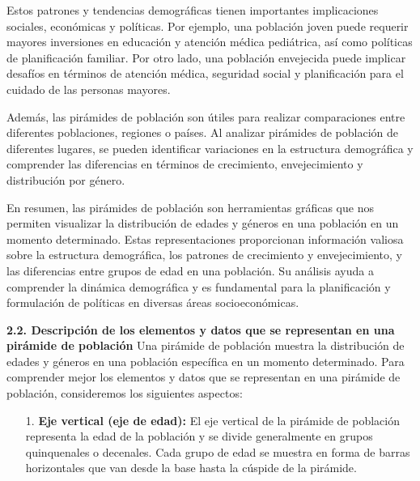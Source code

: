 \documentclass[8pt,a4paper]{beamer}
\begin{document}
{\begin{frame}{}
\begin{block}{}
Estos patrones y tendencias demográficas tienen importantes implicaciones sociales, económicas y políticas. Por ejemplo, una población joven puede requerir mayores inversiones en educación y atención médica pediátrica, así como políticas de planificación familiar. Por otro lado, una población envejecida puede implicar desafíos en términos de atención médica, seguridad social y planificación para el cuidado de las personas mayores.

Además, las pirámides de población son útiles para realizar comparaciones entre diferentes poblaciones, regiones o países. Al analizar pirámides de población de diferentes lugares, se pueden identificar variaciones en la estructura demográfica y comprender las diferencias en términos de crecimiento, envejecimiento y distribución por género.

\end{block}

\end{frame}

\begin{frame}{}
\begin{block}{}
\justifying

En resumen, las pirámides de población son herramientas gráficas que nos permiten visualizar la distribución de edades y géneros en una población en un momento determinado. Estas representaciones proporcionan información valiosa sobre la estructura demográfica, los patrones de crecimiento y envejecimiento, y las diferencias entre grupos de edad en una población. Su análisis ayuda a comprender la dinámica demográfica y es fundamental para la planificación y formulación de políticas en diversas áreas socioeconómicas.
\end{block}
\end{frame}

\begin{frame}{}
\begin{block}{\textbf{2.2. Descripción de los elementos y datos que se representan en una pirámide de población}}
\justifying
Una pirámide de población muestra la distribución de edades y géneros en una población específica en un momento determinado. Para comprender mejor los elementos y datos que se representan en una pirámide de población, consideremos los siguientes aspectos:
\begin{enumerate}
\justifying
\item[1.] \textbf{Eje vertical (eje de edad):} El eje vertical de la pirámide de población representa la edad de la población y se divide generalmente en grupos quinquenales o decenales. Cada grupo de edad se muestra en forma de barras horizontales que van desde la base hasta la cúspide de la pirámide.


\end{enumerate}
\end{block}
\end{frame}}
\end{document}
